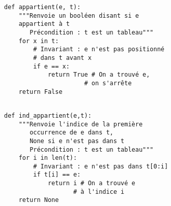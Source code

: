 \exer{}
\setcounter{numques}{0}


\begin{lstlisting}
def appartient(e, t):
    """Renvoie un booléen disant si e 
    appartient à t
       Précondition : t est un tableau"""
    for x in t:
        # Invariant : e n'est pas positionné 
        # dans t avant x
        if e == x:
            return True # On a trouvé e, 
                      # on s'arrête
    return False
 
\end{lstlisting}


\begin{lstlisting}
def ind_appartient(e,t):
    """Renvoie l'indice de la première 
       occurrence de e dans t,
       None si e n'est pas dans t
       Précondition : t est un tableau"""
    for i in len(t):
        # Invariant : e n'est pas dans t[0:i]
        if t[i] == e:
            return i # On a trouvé e 
                   # à l'indice i
    return None
\end{lstlisting}